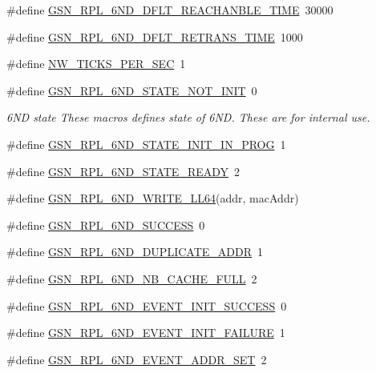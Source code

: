 \begin{DoxyCompactItemize}
\item 
\#define \hyperlink{a00473_a3039f7d9f2d24633734777147ec84fc0}{GSN\_\-RPL\_\-6ND\_\-DFLT\_\-REACHANBLE\_\-TIME}~30000
\item 
\#define \hyperlink{a00473_ae631ace4f672c62f6cf26184663a1a64}{GSN\_\-RPL\_\-6ND\_\-DFLT\_\-RETRANS\_\-TIME}~1000
\item 
\#define \hyperlink{a00473_acc8cf38bbb334e023603baaf65ffcb2f}{NW\_\-TICKS\_\-PER\_\-SEC}~1
\item 
\#define \hyperlink{a00473_a6ebf22e3146df8d19f3a8021227b1ebe}{GSN\_\-RPL\_\-6ND\_\-STATE\_\-NOT\_\-INIT}~0
\begin{DoxyCompactList}\small\item\em 6ND state These macros defines state of 6ND. These are for internal use. \end{DoxyCompactList}\item 
\#define \hyperlink{a00473_a3af8b30b7cd03854b8474534842ddc6a}{GSN\_\-RPL\_\-6ND\_\-STATE\_\-INIT\_\-IN\_\-PROG}~1
\item 
\#define \hyperlink{a00473_a91a4d2770ff399e288fced8e9ef1091c}{GSN\_\-RPL\_\-6ND\_\-STATE\_\-READY}~2
\item 
\#define \hyperlink{a00473_abd25c632d0c01255800d56135f291979}{GSN\_\-RPL\_\-6ND\_\-WRITE\_\-LL64}(addr, macAddr)
\item 
\#define \hyperlink{a00473_a8723f37bf7d4719c669b5cdd2d68f748}{GSN\_\-RPL\_\-6ND\_\-SUCCESS}~0
\item 
\#define \hyperlink{a00473_af8211abe83615504c44e6799a9b07668}{GSN\_\-RPL\_\-6ND\_\-DUPLICATE\_\-ADDR}~1
\item 
\#define \hyperlink{a00473_a7b5b4e73b0e9ff9bc15c9ddef8356b25}{GSN\_\-RPL\_\-6ND\_\-NB\_\-CACHE\_\-FULL}~2
\item 
\#define \hyperlink{a00473_a80cfdd07b9d7835c66228c0c5b1a6293}{GSN\_\-RPL\_\-6ND\_\-EVENT\_\-INIT\_\-SUCCESS}~0
\item 
\#define \hyperlink{a00473_acef4350a88a60e81e1d9daa023ba7708}{GSN\_\-RPL\_\-6ND\_\-EVENT\_\-INIT\_\-FAILURE}~1
\item 
\#define \hyperlink{a00473_a1e5556bde56a94bac3a24077d63387a9}{GSN\_\-RPL\_\-6ND\_\-EVENT\_\-ADDR\_\-SET}~2
\end{DoxyCompactItemize}
